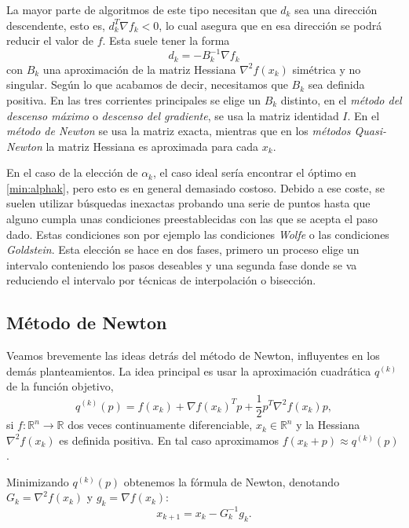\documentclass[11pt,a4paper]{book}
\theoremstyle{definition}
\theoremstyle{remark}
\begin{document}
La mayor parte de algoritmos de este tipo necesitan que $d_k$ sea una dirección descendente, esto es, $d_k^T \nabla f_k < 0$,
lo cual asegura que en esa dirección se podrá reducir el valor de $f$. Esta suele tener la forma
\begin{equation}
	d_k = -B_k^{-1} \nabla f_k
\end{equation}
con $B_k$ una aproximación de la matriz Hessiana $\nabla^2 f(x_k)$ simétrica y no singular. Según lo que acabamos de decir, necesitamos que $B_k$ sea definida positiva. En las tres corrientes principales se elige un $B_k$ distinto, en el \textit{método del descenso máximo} o \textit{descenso del gradiente}, se usa la matriz identidad $I$.
En el \textit{método de Newton} se usa la matriz exacta, mientras que en los \textit{métodos Quasi-Newton} la matriz Hessiana es aproximada para cada $x_k$.

En el caso de la elección de $\alpha_k$, el caso ideal sería encontrar el óptimo en \ref{min:alphak}, pero esto es en general demasiado costoso.
Debido a ese coste, se suelen utilizar búsquedas inexactas probando una serie de puntos hasta que alguno cumpla unas condiciones preestablecidas con las que se acepta el paso dado.
Estas condiciones son por ejemplo las condiciones \textit{Wolfe} o las condiciones \textit{Goldstein}.
Esta elección se hace en dos fases, primero un proceso elige un intervalo conteniendo los pasos deseables y una segunda fase donde se va reduciendo el intervalo por técnicas de interpolación o bisección. %

\subsection{Método de Newton}
Veamos brevemente las ideas detrás del método de Newton, influyentes en los demás planteamientos. La idea principal es usar la aproximación cuadrática $q^{(k)}$ de la función objetivo,
\begin{equation}
	q^{(k)}(p) = f(x_k)+\nabla f(x_k)^Tp + \frac{1}{2}p^T \nabla^2 f(x_k)p,
	\label{eq:NewtonQ}
\end{equation}
si $f:\mathbb{R}^n \rightarrow \mathbb{R}$ dos veces continuamente diferenciable, $x_k \in \mathbb{R}^n$ y la Hessiana $\nabla^2f(x_k)$ es definida positiva. En tal caso aproximamos $f(x_k + p) \approx q^{(k)}(p)$.

Minimizando $q^{(k)}(p)$ obtenemos la fórmula de Newton, denotando $G_k=\nabla^2f(x_k)$ y $g_k = \nabla f(x_k)$:
\begin{equation}
	x_{k+1} = x_k - G_k^{-1} g_k.
	\label{eq:NewtonIter}
\end{equation}
\end{document}
